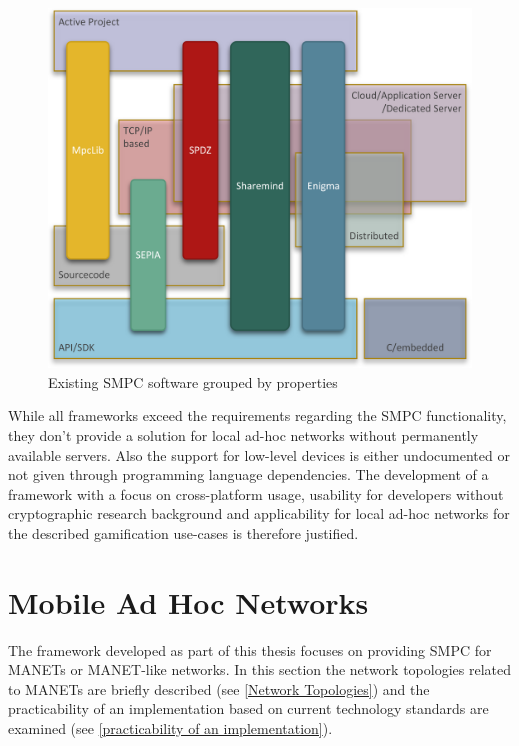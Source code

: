 \begin{figure}[!htb] %
	\caption{Existing \gls{SMPC} software grouped by properties} \label{figure:existing frameworks}
	\includegraphics[scale=1.0]{figures/frameworks.png}
\end{figure}

While all frameworks exceed the requirements regarding the \gls{SMPC} functionality, they don't provide a solution for local ad-hoc networks without permanently available servers. Also the support for low-level devices is either undocumented or not given through programming language dependencies.
The development of a framework with a focus on cross-platform usage, usability for developers without cryptographic research background and applicability for local ad-hoc networks for the described gamification use-cases is therefore justified.

\FloatBarrier

\section{Mobile Ad Hoc Networks} \label{Mobile Ad Hoc Networks}
The framework developed as part of this thesis focuses on providing \gls{SMPC} for \glspl{MANET} or \gls{MANET}-like networks. In this section the network topologies related to \glspl{MANET} are briefly described (see \ref{Network Topologies}) and the practicability of an implementation based on current technology standards are examined (see \ref{practicability of an implementation}).

